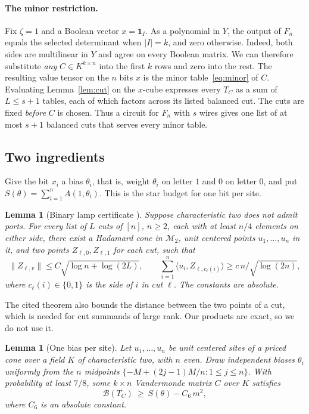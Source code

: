 \documentclass[11pt]{article}
\newtheorem{lemma}[theorem]{Lemma}
\theoremstyle{remark}
\newcommand{\price}{\mathcal B}
\newcommand{\cM}{\mathcal M}
\newcommand{\one}{\mathbf 1}
\newcommand{\ip}[2]{\langle #1,#2\rangle}
\newcommand{\norm}[1]{\lVert #1\rVert}
\begin{document}
\paragraph{The minor restriction.}
Fix \(\zeta=1\) and a Boolean vector \(x=\one_I\). As a polynomial in
\(Y\), the output of \(F_n\) equals the selected determinant when
\(|I|=k\), and zero otherwise. Indeed, both sides are multilinear in
\(Y\) and agree on every Boolean matrix. We can therefore substitute
\emph{any} \(C\in K^{k\times n}\) into the first \(k\) rows and zero into
the rest. The resulting value tensor on the \(n\) bits \(x\) is the minor
table~\eqref{eq:minor} of \(C\). Evaluating Lemma~\ref{lem:cut} on the \(x\)-cube
expresses every \(T_C\) as a sum of \(L\le s+1\) tables, each of which
factors across its listed balanced cut. The cuts are fixed \emph{before}
\(C\) is chosen. Thus a circuit for \(F_n\) with \(s\) wires gives one
list of at most \(s+1\) balanced cuts that serves every minor table.

\subsection{Two ingredients}
Give the bit \(x_i\) a bias \(\theta_i\), that is, weight \(\theta_i\)
on letter \(1\) and \(0\) on letter \(0\), and put
\(S(\theta)=\sum_{i=1}^nA(1,\theta_i)\). This is the star budget for one
bit per site.

\begin{lemma}[Binary lamp certificate {\cite[Theorems 6.1 and 7.1]{hc}}]
\label{lem:lamp}
Suppose characteristic two does not admit ports. For every list of \(L\)
cuts of \([n]\), \(n\ge2\), each with at least \(n/4\) elements on either
side, there exist a Hadamard cone in \(\cM_2\), unit centered points
\(u_1,\ldots,u_n\) in it, and two points \(Z_{\ell,0},Z_{\ell,1}\) for
each cut, such that
\[
 \norm{Z_{\ell,v}}\le C\sqrt{\log n+\log(2L)},\qquad
 \sum_{i=1}^n\ip{u_i}{Z_{\ell,c_\ell(i)}}\ge c\,n/\sqrt{\log(2n)},
\]
where \(c_\ell(i)\in\{0,1\}\) is the side of \(i\) in cut \(\ell\). The
constants are absolute.
\end{lemma}

The cited theorem also bounds the distance between the two points of a
cut, which is needed for cut summands of large rank. Our products are
exact, so we do not use it.

\begin{lemma}[One bias per site]\label{lem:star}
Let \(u_1,\ldots,u_n\) be unit centered sites of a priced cone over a
field \(K\) of characteristic two, with \(n\) even. Draw independent
biases \(\theta_i\) uniformly from the \(n\) midpoints
\(\{-M+(2j-1)M/n:1\le j\le n\}\). With probability at least
\(7/8\), some \(k\times n\) Vandermonde matrix \(C\) over \(K\) satisfies
\begin{equation}\label{eq:star}
 \price(T_C)\ \ge\ S(\theta)-C_6\,m^2 ,
\end{equation}
where \(C_6\) is an absolute constant.
\end{lemma}
\end{document}
